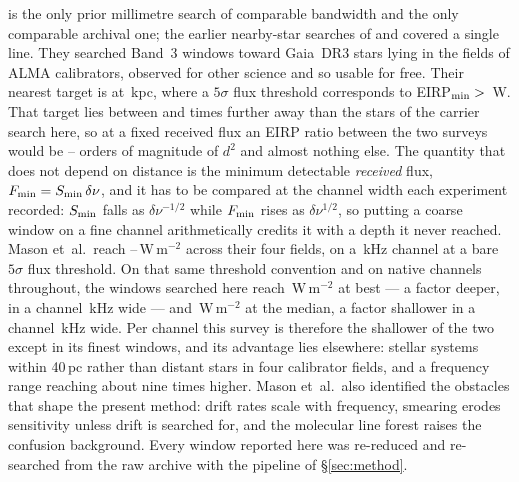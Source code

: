 \citet{Mason2025} is the only prior millimetre search of comparable bandwidth
and the only comparable archival one; the earlier nearby-star searches of
\citet{Steffes1994} and \citet{Mauersberger1996} covered a single line. They searched Band~3 windows toward
\MasonNStar{} Gaia~DR3 stars lying in the fields of \MasonNCal{} ALMA
calibrators, observed for other science and so usable for free. Their
nearest target is at \MasonNearKpc\,kpc, where a $5\sigma$ flux threshold
corresponds to EIRP$_{\rm min}>{}$\MasonNearEirp\,W. That target lies
between \MasonDistRatioFar{} and \MasonDistRatioNear{} times further away
than the stars of the carrier search here, so at a fixed received flux an
EIRP ratio between the two surveys would be
\MasonEirpOrdLo--\MasonEirpOrdHi{} orders of magnitude of $d^{2}$ and
almost nothing else. The quantity
that does not depend on distance is the minimum detectable \emph{received}
flux, $F_{\rm min}=S_{\rm min}\,\delta\nu$, and it has to be compared at
the channel width each experiment recorded: $S_{\rm min}$ falls as
$\delta\nu^{-1/2}$ while $F_{\rm min}$ rises as $\delta\nu^{1/2}$, so
putting a coarse window on a fine channel arithmetically credits it with a
depth it never reached. Mason
et~al.\ reach \MasonFluxLo--\MasonFluxHi\,W\,m$^{-2}$ across their four
fields, on a \MasonChanKHz\,kHz channel at a bare $5\sigma$ flux
threshold. On that same threshold convention and on native channels
throughout, the windows searched here reach \FluxTrigBest\,W\,m$^{-2}$ at
best --- a factor \FluxNatBestRatio{} deeper, in a channel
\FluxChanBestKHz\,kHz wide --- and \FluxTrigMed\,W\,m$^{-2}$ at the
median, a factor \FluxNatMedRatio{} shallower in a channel
\FluxChanMedKHz\,kHz wide. Per channel this survey is therefore the
shallower of the two except in its finest windows, and its advantage lies
elsewhere: \NSysClassA{} stellar systems within 40\,pc rather than distant
stars in four calibrator fields, and a frequency range reaching about nine
times higher. Mason et~al.\ also
identified the obstacles that shape the present method: drift rates scale
with frequency, smearing erodes sensitivity unless drift is searched for,
and the molecular line forest raises the confusion background. Every
window reported here was re-reduced and re-searched from the raw archive
with the pipeline of \S\ref{sec:method}.

